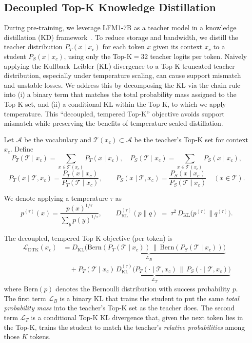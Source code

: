 \documentclass{article}
\begin{document}
\subsection{Decoupled Top-K Knowledge Distillation}
\label{subsec:KD}

During pre-training, we leverage LFM1-7B as a teacher model in a knowledge distillation (KD) framework~\citep{hinton2015distilling}. To reduce storage and bandwidth, we distill the teacher distribution $P_T(x\mid x_c)$ for each token $x$ given its context $x_c$ to a student $P_S(x\mid x_c)$, using only the Top-K${=}32$ teacher logits per token. Naively applying the Kullback–Leibler (KL) divergence to a Top-K truncated teacher distribution, especially under temperature scaling, can cause support mismatch and unstable losses. We address this by decomposing the KL via the chain rule into (i) a binary term that matches the total probability mass assigned to the Top-K set, and (ii) a conditional KL within the Top-K, to which we apply temperature. This “decoupled, tempered Top-K” objective avoids support mismatch while preserving the benefits of temperature-scaled distillation.

Let \(\mathcal A\) be the vocabulary and \(\mathcal T(x_c)\subset\mathcal A\) be the teacher’s Top-K set for context \(x_c\). Define
\[
P_T(\mathcal T\mid x_c)=\sum_{x\in \mathcal T(x_c)}P_T(x\mid x_c),\quad
P_S(\mathcal T\mid x_c)=\sum_{x\in \mathcal T(x_c)}P_S(x\mid x_c),
\]
\[
P_T(x\mid \mathcal T,x_c)=\frac{P_T(x\mid x_c)}{P_T(\mathcal T\mid x_c)},\qquad
P_S(x\mid \mathcal T,x_c)=\frac{P_S(x\mid x_c)}{P_S(\mathcal T\mid x_c)}\quad (x\in\mathcal T).
\]

We denote applying a temperature \(\tau\) as
\[
p^{(\tau)}(x)=\frac{p(x)^{1/\tau}}{\sum_{y}p(y)^{1/\tau}},\qquad
D_{\mathrm{KL}}^{(\tau)}(p\|q)\;=\;\tau^2\,D_{\mathrm{KL}}\!\big(p^{(\tau)}\|q^{(\tau)}\big).
\]

The decoupled, tempered Top-K objective (per token) is
\begin{align}
\mathcal L_{\text{DTK}}(x_c)
&=
\underbrace{D_{\mathrm{KL}}\!\big(\mathrm{Bern}(P_T(\mathcal T\mid x_c))\,\big\|\,\mathrm{Bern}(P_S(\mathcal T\mid x_c))\big)}_{\mathcal L_B}
\\[-2pt]
&\quad+
\underbrace{P_T(\mathcal T\mid x_c)\,D_{\mathrm{KL}}^{(\tau)}\!\big(P_T(\cdot\mid \mathcal T,x_c)\,\big\|\,P_S(\cdot\mid \mathcal T,x_c)\big)}_{\mathcal L_T}
\end{align}
where \(\mathrm{Bern}(p)\) denotes the Bernoulli distribution with success probability \(p\). The first term $\mathcal{L}_B$ is a binary KL that trains the student to put the same \emph{total probability mass} into the teacher's Top-K set as the teacher does. The second term $\mathcal{L}_T$ is a conditional Top-K KL divergence that, given the next token lies in the Top-K, trains the student to match the teacher’s \emph{relative probabilities} among those \(K\) tokens. 
\end{document}
